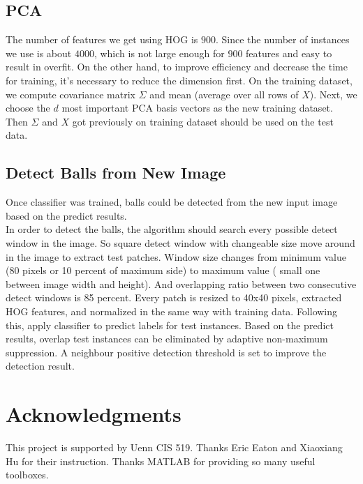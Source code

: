 \documentclass{article}
\begin{document}
\subsection{PCA}
The number of features we get using HOG is $900$. Since the number of instances we use is about $4000$, which is not large enough for $900$ features and easy to result in overfit. On the other hand, to improve efficiency and decrease the time for training, it's necessary to reduce the dimension first. On the training dataset, we compute covariance matrix $\Sigma$ and mean (average over all rows of $X$). Next, we choose the $d$ most important PCA basis vectors as the new training dataset. Then $\Sigma$ and $X$ got previously on training dataset should be used on the test data.




\subsection{Detect Balls from New Image}
Once classifier was trained, balls could be detected from the new input image based on the predict results. \\
In order to detect the balls, the algorithm should search every possible detect window in the image. So square detect window with changeable size move around in the image to extract test patches. Window size changes from minimum value (80 pixels or 10 percent of maximum side) to maximum value ( small one between image width and height). And overlapping ratio between two consecutive detect windows is 85 percent.  Every patch is resized to 40x40 pixels, extracted HOG features, and normalized in the same way with training data. Following this, apply classifier to predict labels for test instances. Based on the predict results, overlap test instances can be eliminated by adaptive non-maximum suppression. A neighbour positive detection threshold is set to improve the detection result. 
 


\section*{Acknowledgments} 
This project is supported by Uenn CIS 519. Thanks Eric Eaton and Xiaoxiang Hu for their instruction. Thanks MATLAB for providing so many useful toolboxes.



\end{document}
